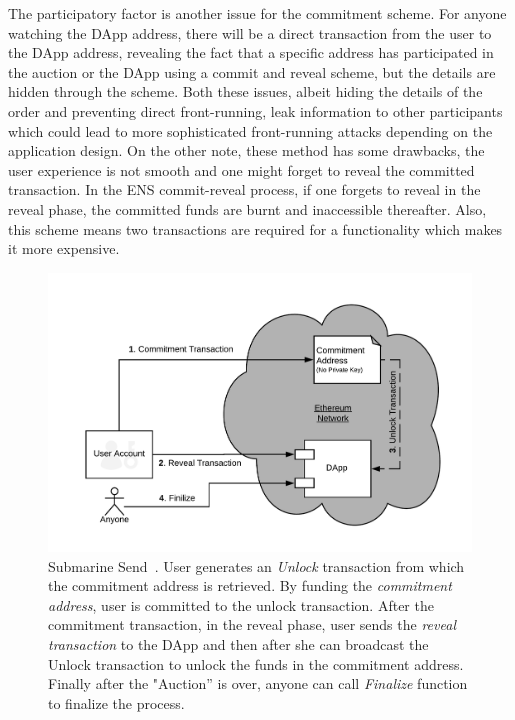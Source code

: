 The participatory factor is another issue for the commitment scheme. For anyone watching the DApp address, there will be a direct transaction from the user to the DApp address, revealing the fact that a specific address has participated in the auction or the DApp using a commit and reveal scheme, but the details are hidden through the scheme. Both these issues, albeit hiding the details of the order and preventing direct front-running, leak information to other participants which could lead to more sophisticated front-running attacks depending on the application design. On the other note, these method has some drawbacks, the user experience is not smooth and one might forget to reveal the committed transaction. In the ENS commit-reveal process, if one forgets to reveal in the reveal phase, the committed funds are burnt and inaccessible thereafter. Also, this scheme means two transactions are required for a functionality which makes it more expensive.

\begin{figure}[t]
\centering
\includegraphics[width=0.5\linewidth]{figures/LibSubmarine.png}
\caption{ Submarine Send~\cite{libsubmarine}. User generates an \textit{Unlock} transaction from which the commitment address is retrieved. By funding the \textit{commitment address}, user is committed to the unlock transaction. After the commitment transaction, in the reveal phase, user sends the \textit{reveal transaction} to the DApp and then after she can broadcast the Unlock transaction to unlock the funds in the commitment address. Finally after the "Auction'' is over, anyone can call \textit{Finalize} function to finalize the process.  \label{fig:LibSubmarine}}
\end{figure}

